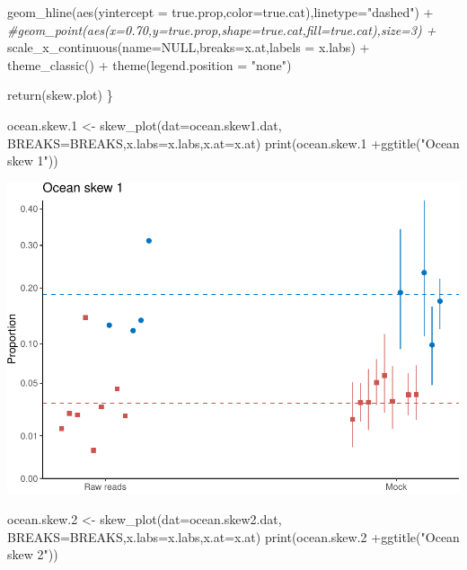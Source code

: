\documentclass[
]{article}
\newenvironment{Shaded}{\begin{snugshade}}{\end{snugshade}}
\newcommand{\AttributeTok}[1]{\textcolor[rgb]{0.77,0.63,0.00}{#1}}
\newcommand{\CommentTok}[1]{\textcolor[rgb]{0.56,0.35,0.01}{\textit{#1}}}
\newcommand{\ConstantTok}[1]{\textcolor[rgb]{0.00,0.00,0.00}{#1}}
\newcommand{\FloatTok}[1]{\textcolor[rgb]{0.00,0.00,0.81}{#1}}
\newcommand{\FunctionTok}[1]{\textcolor[rgb]{0.00,0.00,0.00}{#1}}
\newcommand{\NormalTok}[1]{#1}
\newcommand{\OtherTok}[1]{\textcolor[rgb]{0.56,0.35,0.01}{#1}}
\newcommand{\SpecialCharTok}[1]{\textcolor[rgb]{0.00,0.00,0.00}{#1}}
\newcommand{\StringTok}[1]{\textcolor[rgb]{0.31,0.60,0.02}{#1}}
\begin{document}
\begin{Shaded}
\begin{Highlighting}[]
    \FunctionTok{geom\_hline}\NormalTok{(}\FunctionTok{aes}\NormalTok{(}\AttributeTok{yintercept =}\NormalTok{ true.prop,}\AttributeTok{color=}\NormalTok{true.cat),}\AttributeTok{linetype=}\StringTok{"dashed"}\NormalTok{) }\SpecialCharTok{+}
    \CommentTok{\#geom\_point(aes(x=0.70,y=true.prop,shape=true.cat,fill=true.cat),size=3) +}
    \FunctionTok{scale\_x\_continuous}\NormalTok{(}\AttributeTok{name=}\ConstantTok{NULL}\NormalTok{,}\AttributeTok{breaks=}\NormalTok{x.at,}\AttributeTok{labels =}\NormalTok{ x.labs) }\SpecialCharTok{+}
    \FunctionTok{theme\_classic}\NormalTok{() }\SpecialCharTok{+}
    \FunctionTok{theme}\NormalTok{(}\AttributeTok{legend.position =} \StringTok{"none"}\NormalTok{)}
  
  \FunctionTok{return}\NormalTok{(skew.plot)}
\NormalTok{\}}


\NormalTok{ocean.skew}\FloatTok{.1} \OtherTok{\textless{}{-}} \FunctionTok{skew\_plot}\NormalTok{(}\AttributeTok{dat=}\NormalTok{ocean.skew1.dat,}
                          \AttributeTok{BREAKS=}\NormalTok{BREAKS,}\AttributeTok{x.labs=}\NormalTok{x.labs,}\AttributeTok{x.at=}\NormalTok{x.at) }
\FunctionTok{print}\NormalTok{(ocean.skew}\FloatTok{.1}  \SpecialCharTok{+}\FunctionTok{ggtitle}\NormalTok{(}\StringTok{"Ocean skew 1"}\NormalTok{))                }
\end{Highlighting}
\end{Shaded}

\includegraphics{Appendix-S4_files/figure-latex/stan_plotting_bayes-1.pdf}

\begin{Shaded}
\begin{Highlighting}[]
\NormalTok{ocean.skew}\FloatTok{.2} \OtherTok{\textless{}{-}} \FunctionTok{skew\_plot}\NormalTok{(}\AttributeTok{dat=}\NormalTok{ocean.skew2.dat,}
                          \AttributeTok{BREAKS=}\NormalTok{BREAKS,}\AttributeTok{x.labs=}\NormalTok{x.labs,}\AttributeTok{x.at=}\NormalTok{x.at) }
\FunctionTok{print}\NormalTok{(ocean.skew}\FloatTok{.2} \SpecialCharTok{+}\FunctionTok{ggtitle}\NormalTok{(}\StringTok{"Ocean skew 2"}\NormalTok{))}
\end{Highlighting}
\end{Shaded}
\end{document}
